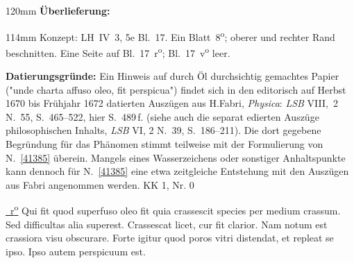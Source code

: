 \begin{ledgroupsized}[r]{120mm}
\footnotesize
\pstart
\noindent\textbf{Überlieferung:}
\pend
\end{ledgroupsized}
\begin{ledgroupsized}[r]{114mm}
\footnotesize
\pstart
\parindent -6mm
%
Konzept:
LH~IV~3, 5e Bl.~17.
Ein Blatt~8\textsuperscript{o};
oberer und rechter Rand beschnitten. 
Eine Seite auf Bl.~17~r\textsuperscript{o}; Bl.~17~v\textsuperscript{o} leer.
\pend
\end{ledgroupsized}
\vspace{5mm}
\begin{ledgroup}
\footnotesize
\pstart
\noindent
\textbf{Datierungsgründe:}
Ein Hinweis auf durch Öl durchsichtig gemachtes Papier ("unde charta affuso oleo, fit perspicua") findet sich in den 
editorisch auf Herbst 1670 bis Frühjahr 1672 datierten
\cite{01234}Auszügen aus H.\;Fabri, \textit{Physica}: 
\textit{LSB} VIII,~2 N.~55, S.~465--522, hier S.~489\,f. (siehe auch die separat edierten \cite{01120}Auszüge philosophischen Inhalts, \textit{LSB} VI, 2 N.~39, S.~186--211). 
Die dort gegebene Begründung für das Phänomen stimmt teilweise mit der Formulierung von N.~\ref{41385} überein.
\pend
\pstart
Mangels eines Wasserzeichens oder sonstiger Anhaltspunkte kann dennoch für N.~\ref{41385} eine etwa zeitgleiche Entstehung mit den Auszügen aus Fabri angenommen werden.
\pend
\pstart\noindent
KK 1, Nr. 0
\pend
\end{ledgroup}
\vspace{8mm}
\pstart
\noindent
\href{\Scan{LH_04_03_05e_017r}}%
{~r\textsuperscript{o}\rbrack} 
Qui fit quod 
superfuso oleo
 fit
quia crassescit species per medium crassum. Sed difficultas alia superest. Crassescat licet, cur fit clarior. Nam notum est crassiora visu obscurare. Forte igitur quod poros vitri distendat, et repleat se ipso. Ipso autem perspicuum est.

